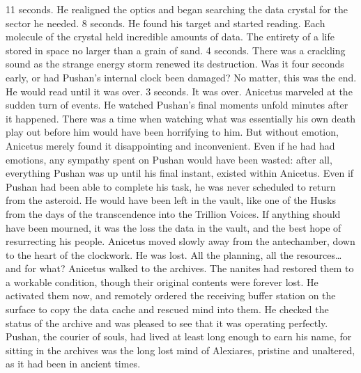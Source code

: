 \documentclass[a4paper]{article}
\begin{document}
11 seconds.
He realigned the optics and began searching the data crystal for the sector he needed.
8 seconds.
He found his target and started reading. Each molecule of the crystal held incredible amounts of data. The entirety of a life stored in space no larger than a grain of sand.
4 seconds.
There was a crackling sound as the strange energy storm renewed its destruction. Was it four seconds early, or had Pushan’s internal clock been damaged? No matter, this was the end. He would read until it was over.
3 seconds.
It was over.
Anicetus marveled at the sudden turn of events. He watched Pushan’s final moments unfold minutes after it happened. There was a time when watching what was essentially his own death play out before him would have been horrifying to him. But without emotion, Anicetus merely found it disappointing and inconvenient.
Even if he had had emotions, any sympathy spent on Pushan would have been wasted: after all, everything Pushan was up until his final instant, existed within Anicetus. Even if Pushan had been able to complete his task, he was never scheduled to return from the asteroid. He would have been left in the vault, like one of the Husks from the days of the transcendence into the Trillion Voices.
If anything should have been mourned, it was the loss the data in the vault, and the best hope of resurrecting his people. Anicetus moved slowly away from the antechamber, down to the heart of the clockwork. He was lost. All the planning, all the resources… and for what?
Anicetus walked to the archives. The nanites had restored them to a workable condition, though their original contents were forever lost. He activated them now, and remotely ordered the receiving buffer station on the surface to copy the data cache and rescued mind into them. He checked the status of the archive and was pleased to see that it was operating perfectly.
Pushan, the courier of souls, had lived at least long enough to earn his name, for sitting in the archives was the long lost mind of Alexiares, pristine and unaltered, as it had been in ancient times.
\end{document}
